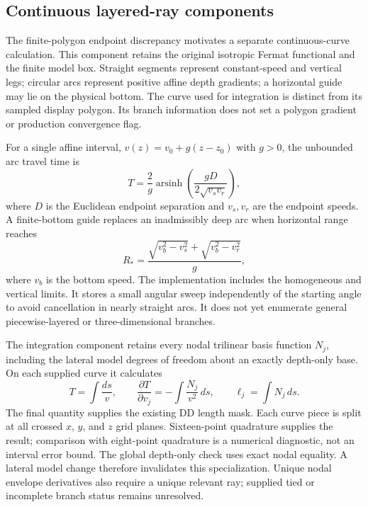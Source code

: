 \subsection{Continuous layered-ray components}

The finite-polygon endpoint discrepancy motivates a separate continuous-curve
calculation. This component retains the original isotropic Fermat functional
and the finite model box. Straight segments represent constant-speed and
vertical legs; circular arcs represent positive affine depth gradients; a
horizontal guide may lie on the physical bottom. The curve used for integration
is distinct from its sampled display polygon. Its branch information does not
set a polygon gradient or production convergence flag.

For a single affine interval, $v(z)=v_0+g(z-z_0)$ with $g>0$, the unbounded
arc travel time is
\begin{equation}
 T=\frac{2}{g}\operatorname{arsinh}
 \left(\frac{gD}{2\sqrt{v_s v_r}}\right),
\end{equation}
where $D$ is the Euclidean endpoint separation and $v_s,v_r$ are the endpoint
speeds. A finite-bottom guide replaces an inadmissibly deep arc when horizontal
range reaches
\begin{equation}
 R_* = \frac{\sqrt{v_b^2-v_s^2}+\sqrt{v_b^2-v_r^2}}{g},
\end{equation}
where $v_b$ is the bottom speed. The implementation includes the homogeneous
and vertical limits. It stores a small angular sweep independently of the
starting angle to avoid cancellation in nearly straight arcs. It does not yet
enumerate general piecewise-layered or three-dimensional branches.

The integration component retains every nodal trilinear basis function $N_j$,
including the lateral model degrees of freedom about an exactly depth-only
base. On each supplied curve it calculates
\begin{equation}
 T=\int\frac{ds}{v},\qquad
 \frac{\partial T}{\partial v_j}=-\int\frac{N_j}{v^2}\,ds,\qquad
 \ell_j=\int N_j\,ds.
\end{equation}
The final quantity supplies the existing DD length mask. Each curve piece is
split at all crossed $x$, $y$, and $z$ grid planes. Sixteen-point quadrature
supplies the result; comparison with eight-point quadrature is a numerical
diagnostic, not an interval error bound. The global depth-only check uses
exact nodal equality. A lateral model change therefore invalidates this
specialization. Unique nodal envelope derivatives also require a unique
relevant ray; supplied tied or incomplete branch status remains unresolved.

